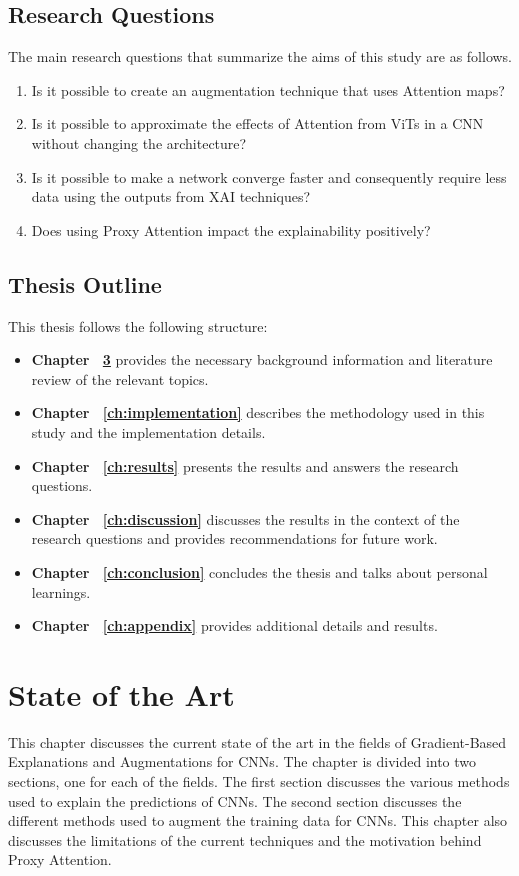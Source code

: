 \documentclass[a4paper,11pt,openright]{book}
\begin{document}
\section{Research Questions} \label{section:researchq}
The main research questions that summarize the aims of this study are as follows.
\begin{enumerate}
    \item Is it possible to create an augmentation technique that uses Attention maps?
    \item Is it possible to approximate the effects of Attention from ViTs in a CNN without changing the architecture?
    \item Is it possible to make a network converge faster and consequently require less data using the outputs from XAI techniques?
    \item Does using Proxy Attention impact the explainability positively?
\end{enumerate}
\section{Thesis Outline}
This thesis follows the following structure:
\begin{itemize}
    \item \textbf{Chapter ~\ref{ch:sota}} provides the necessary background information and literature review of the relevant topics.
    \item \textbf{Chapter ~\ref{ch:implementation}} describes the methodology used in this study and the implementation details.
    \item \textbf{Chapter ~\ref{ch:results}} presents the results and answers the research questions.
    \item \textbf{Chapter ~\ref{ch:discussion}} discusses the results in the context of the research questions and provides recommendations for future work.
    \item \textbf{Chapter ~\ref{ch:conclusion}} concludes the thesis and talks about personal learnings.
    \item \textbf{Chapter ~\ref{ch:appendix}} provides additional details and results.
\end{itemize}

\chapter{State of the Art} \label{ch:sota}
This chapter discusses the current state of the art in the fields of Gradient-Based Explanations and Augmentations for CNNs. The chapter is divided into two sections, one for each of the fields. The first section discusses the various methods used to explain the predictions of CNNs. The second section discusses the different methods used to augment the training data for CNNs. This chapter also discusses the limitations of the current techniques and the motivation behind Proxy Attention.
\end{document}
